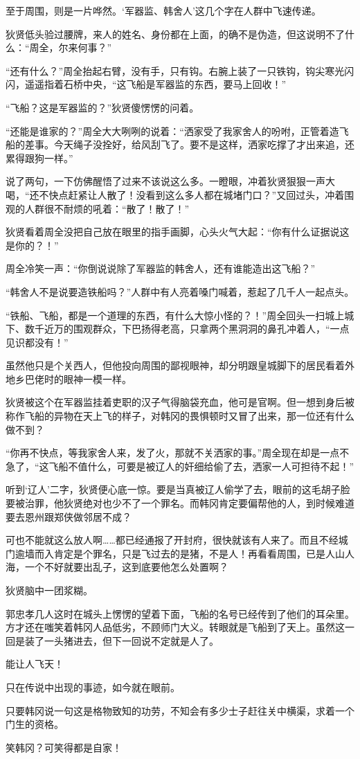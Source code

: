 至于周围，则是一片哗然。‘军器监、韩舍人’这几个字在人群中飞速传递。

狄贤低头验过腰牌，来人的姓名、身份都在上面，的确不是伪造，但这说明不了什么：“周全，尔来何事？”

“还有什么？”周全抬起右臂，没有手，只有钩。右腕上装了一只铁钩，钩尖寒光闪闪，遥遥指着石桥中央，“这飞船是军器监的东西，要马上回收！”

“飞船？这是军器监的？”狄贤傻愣愣的问着。

“还能是谁家的？”周全大大咧咧的说着：“洒家受了我家舍人的吩咐，正管着造飞船的差事。今天绳子没拴好，给风刮飞了。要不是这样，洒家吃撑了才出来追，还累得跟狗一样。”

说了两句，一下仿佛醒悟了过来不该说这么多。一瞪眼，冲着狄贤狠狠一声大喝，“还不快点赶紧让人散了！没看到这么多人都在城堵门口？”又回过头，冲着围观的人群很不耐烦的吼着：“散了！散了！”

狄贤看着周全没把自己放在眼里的指手画脚，心头火气大起：“你有什么证据说这是你的？！”

周全冷笑一声：“你倒说说除了军器监的韩舍人，还有谁能造出这飞船？”

“韩舍人不是说要造铁船吗？”人群中有人亮着嗓门喊着，惹起了几千人一起点头。

“铁船、飞船，都是一个道理的东西，有什么大惊小怪的？！”周全回头一扫城上城下、数千近万的围观群众，下巴扬得老高，只拿两个黑洞洞的鼻孔冲着人，“一点见识都没有！”

虽然他只是个关西人，但他投向周围的鄙视眼神，却分明跟皇城脚下的居民看着外地乡巴佬时的眼神一模一样。

狄贤被这个在军器监挂着吏职的汉子气得脑袋充血，他可是官啊。但一想到身后被称作飞船的异物在天上飞的样子，对韩冈的畏惧顿时又冒了出来，那一位还有什么做不到？

“你再不快点，等我家舍人来，发了火，那就不关洒家的事。”周全现在却是一点不急了，“这飞船不值什么，可要是被辽人的奸细给偷了去，洒家一人可担待不起！”

听到‘辽人’二字，狄贤便心底一惊。要是当真被辽人偷学了去，眼前的这毛胡子脸要被治罪，他狄贤绝对也少不了一个罪名。而韩冈肯定要偏帮他的人，到时候难道要去恩州跟郑侠做邻居不成？

可也不能就这么放人啊……都已经通报了开封府，很快就该有人来了。而且不经城门逾墙而入肯定是个罪名，只是飞过去的是猪，不是人！再看看周围，已是人山人海，一个不好就要出乱子，这到底要他怎么处置啊？

狄贤脑中一团浆糊。

郭忠孝几人这时在城头上愣愣的望着下面，飞船的名号已经传到了他们的耳朵里。方才还在嗤笑着韩冈人品低劣，不顾师门大义。转眼就是飞船到了天上。虽然这一回是装了一头猪进去，但下一回说不定就是人了。

能让人飞天！

只在传说中出现的事迹，如今就在眼前。

只要韩冈说一句这是格物致知的功劳，不知会有多少士子赶往关中横渠，求着一个门生的资格。

笑韩冈？可笑得都是自家！

